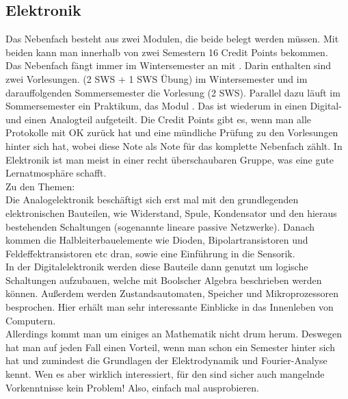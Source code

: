 \subsection{Elektronik}
\label{subsec:elektronik}
Das Nebenfach  besteht aus zwei Modulen, die beide belegt werden müssen. Mit beiden kann man innerhalb von zwei Semestern 16 Credit Points bekommen.\\
Das Nebenfach fängt immer im Wintersemester an mit .
Darin enthalten sind zwei Vorlesungen.  (2 SWS + 1 SWS Übung) im Wintersemester und im darauffolgenden Sommersemester die Vorlesung  (2 SWS). Parallel dazu läuft im Sommersemester ein Praktikum, das Modul . Das ist wiederum in einen Digital- und einen Analogteil aufgeteilt. Die Credit Points gibt es, wenn man alle Protokolle mit OK zurück hat und eine mündliche Prüfung zu den Vorlesungen hinter sich hat, wobei diese Note als Note für das komplette Nebenfach zählt. In Elektronik ist man meist in einer recht überschaubaren Gruppe, was eine gute Lernatmosphäre schafft.\\
Zu den Themen:\\
Die Analogelektronik beschäftigt sich erst mal mit den grundlegenden elektronischen Bauteilen, wie Widerstand, Spule, Kondensator und den hieraus bestehenden Schaltungen (sogenannte lineare passive Netzwerke). Danach kommen die Halbleiterbauelemente wie Dioden, Bipolartransistoren und Feldeffektransistoren etc dran, sowie eine Einführung in die Sensorik.\\
In der Digitalelektronik werden diese Bauteile dann genutzt um logische Schaltungen aufzubauen, welche mit Boolscher Algebra beschrieben werden können. Au\ss erdem werden Zustandsautomaten, Speicher und Mikroprozessoren besprochen. Hier erhält man sehr interessante Einblicke in das Innenleben von Computern.\\
Allerdings kommt man um einiges an Mathematik nicht drum herum. Deswegen hat man auf jeden Fall einen Vorteil, wenn man schon ein Semester hinter sich hat und zumindest die Grundlagen der Elektrodynamik und Fourier-Analyse kennt. Wen es aber wirklich interessiert, für den sind sicher auch mangelnde Vorkenntnisse kein Problem! Also, einfach mal ausprobieren.
